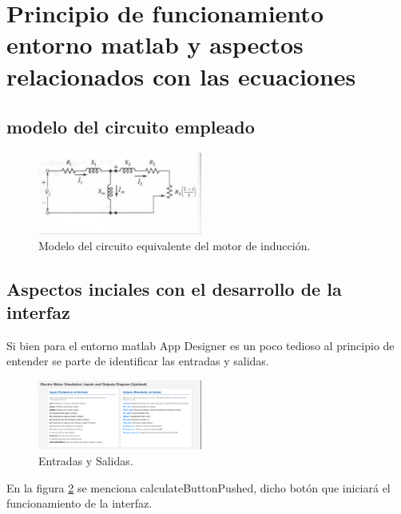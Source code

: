 \section{Principio de funcionamiento entorno matlab y aspectos relacionados con las ecuaciones} 
\subsection{modelo del circuito empleado}

\begin{figure}[ht!]
    \centering
    \includegraphics[width=0.48\textwidth]{imginterfaz/circuito equivalente.png}
    \caption{Modelo del circuito equivalente del motor de inducción.}
    \label{fig:circuitoEquivalente}
\end{figure}

\subsection{Aspectos inciales con el desarrollo de la interfaz}
Si bien para el entorno matlab App Designer es un poco tedioso al principio de entender se parte de identificar las entradas y salidas.

\begin{figure}[ht!]
    \centering
    \includegraphics[width=0.48\textwidth]{imginterfaz/identificandoEntradas.png}
    \caption{Entradas y Salidas.\label{fig:identificandoEntradas}}
\end{figure}
En la figura \ref*{fig:identificandoEntradas} se menciona calculateButtonPushed, dicho botón que iniciará el funcionamiento de la interfaz.




